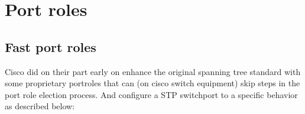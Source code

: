 
\section{Port roles}

\subsection{Fast port roles}
Cisco did on their part early on enhance the original spanning tree standard with some proprietary portroles that can (on cisco switch equipment) skip steps in the port role election process. And configure a STP switchport to a specific behavior as described below:

